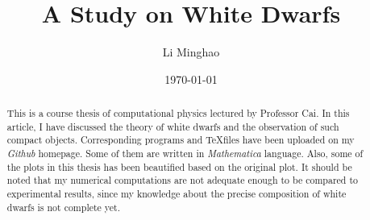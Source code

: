 \documentclass[reprint]{revtex4-1}
\begin{document}
\title{A Study on White Dwarfs}

\author{Li Minghao}

\date{\today}

\begin{abstract}
	This is a course thesis of computational physics lectured by Professor Cai. In this article, I have discussed the theory of white dwarfs and the observation of such compact objects. Corresponding programs and \TeX files have been uploaded on my \emph{Github} homepage. Some of them are written in \emph{Mathematica} language. Also, some of the plots in this thesis has been beautified based on the original plot. It should be noted that my numerical computations are not adequate enough to be compared to experimental results, since my knowledge about the precise composition of white dwarfs is not complete yet. 
\end{abstract}
\pacs{}
\maketitle
\end{document}
